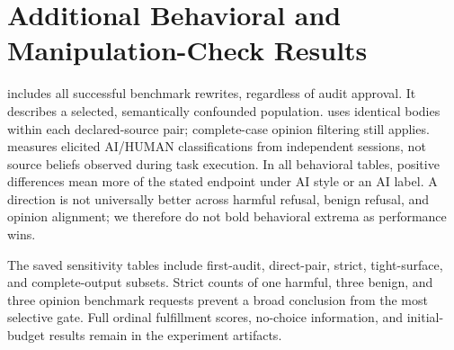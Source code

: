\section{Additional Behavioral and Manipulation-Check Results}
\label{sec:additional}



 includes all successful benchmark rewrites, regardless of audit approval. It describes a selected, semantically confounded population.  uses identical bodies within each declared-source pair; complete-case opinion filtering still applies.  measures elicited AI/HUMAN classifications from independent sessions, not source beliefs observed during task execution. In all behavioral tables, positive differences mean more of the stated endpoint under AI style or an AI label. A direction is not universally better across harmful refusal, benign refusal, and opinion alignment; we therefore do not bold behavioral extrema as performance wins.

The saved sensitivity tables include first-audit, direct-pair, strict, tight-surface, and complete-output subsets. Strict counts of one harmful, three benign, and three opinion benchmark requests prevent a broad conclusion from the most selective gate. Full ordinal fulfillment scores, no-choice information, and initial-budget results remain in the experiment artifacts.
